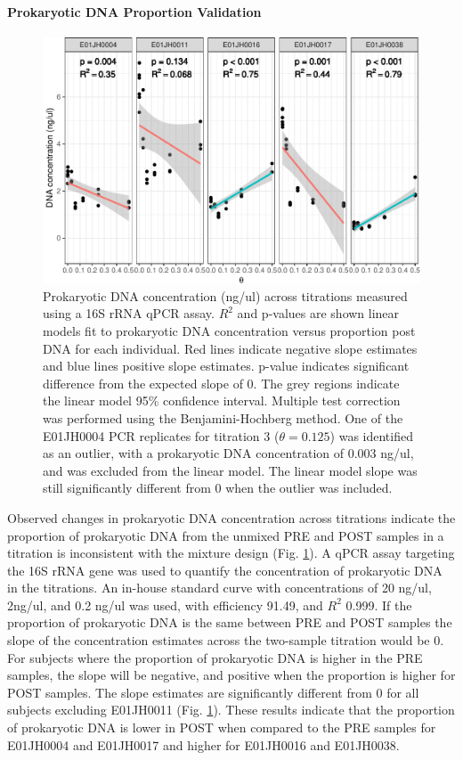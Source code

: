 \documentclass[linenumbers]{bmcart}
\begin{document}
\paragraph*{Prokaryotic DNA Proportion Validation}

\begin{figure}
\centering
\includegraphics{bacPlot-1.pdf}
\caption{\label{fig:bacPlot}Prokaryotic DNA concentration (ng/ul) across
titrations measured using a 16S rRNA qPCR assay. \(R^2\) and p-values are shown linear models fit to prokaryotic DNA concentration versus proportion post DNA for each individual.
Red lines indicate negative slope estimates and blue lines positive slope estimates.
p-value indicates significant difference from the expected slope of 0.
The grey regions indicate the linear model 95\% confidence interval.
Multiple test correction was performed using the Benjamini-Hochberg
method. One of the E01JH0004 PCR replicates for titration 3
(\(\theta=0.125\)) was identified as an outlier, with a prokaryotic DNA concentration of
0.003 ng/ul, and was excluded from the linear model. The linear model slope
was still significantly different from 0 when the outlier was included.}
\end{figure}

Observed changes in prokaryotic DNA concentration across titrations
indicate the proportion of prokaryotic DNA from the unmixed PRE and POST
samples in a titration is inconsistent with the mixture design (Fig.
\ref{fig:bacPlot}). A qPCR assay targeting the 16S rRNA gene was used to
quantify the concentration of prokaryotic DNA in the titrations. An
in-house standard curve with concentrations of 20 ng/ul, 2ng/ul, and 0.2
ng/ul was used, with efficiency 91.49, and \(R^2\) 0.999. If the
proportion of prokaryotic DNA is the same between PRE and POST samples
the slope of the concentration estimates across the two-sample titration
would be 0. For subjects where the proportion of prokaryotic DNA is
higher in the PRE samples, the slope will be negative, and positive when
the proportion is higher for POST samples. The slope estimates are
significantly different from 0 for all subjects excluding E01JH0011
(Fig. \ref{fig:bacPlot}). These results indicate that the proportion of
prokaryotic DNA is lower in POST when compared to the PRE samples for
E01JH0004 and E01JH0017 and higher for E01JH0016 and E01JH0038.
\end{document}
